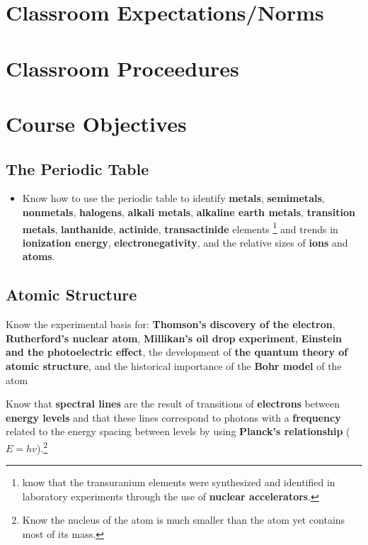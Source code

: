 \documentclass[11pt]{article}
\begin{document}
\section{Classroom Expectations/Norms}
\label{sec:org4b822a9}

\section{Classroom Proceedures}
\label{sec:orgc2a75fc}

\section{Course Objectives}
\label{sec:orgf25546a}

\subsection{The Periodic Table}
\label{sec:orgbb64a5c}

\begin{itemize}
\item Know how to use the periodic table to identify \textbf{metals}, \textbf{semimetals}, \textbf{nonmetals}, \textbf{halogens}, \textbf{alkali metals}, \textbf{alkaline earth metals}, \textbf{transition metals}, \textbf{lanthanide}, \textbf{actinide}, \textbf{transactinide} elements \footnote{know that the transuranium elements were synthesized and identified in laboratory experiments through the use of \textbf{nuclear accelerators}.} and trends in \textbf{ionization energy}, \textbf{electronegativity}, and the relative sizes of \textbf{ions} and \textbf{atoms}.
\end{itemize}
\subsection{Atomic Structure}
\label{sec:orgb318a99}
Know the experimental basis for: \textbf{Thomson's discovery of the electron}, \textbf{Rutherford's nuclear atom}, \textbf{Millikan's oil drop experiment}, \textbf{Einstein and the photoelectric effect}, the development of \textbf{the quantum theory of atomic structure}, and the historical importance of the \textbf{Bohr model} of the atom

Know that \textbf{spectral lines} are the result of transitions of \textbf{electrons} between \textbf{energy levels} and that these lines correspond to photons with a \textbf{frequency} related to the energy spacing between levels by using \textbf{Planck's relationship} (\(E = hv\)).\footnote{Know the nucleus of the atom is much smaller than the atom yet contains most of its mass.}
\end{document}
